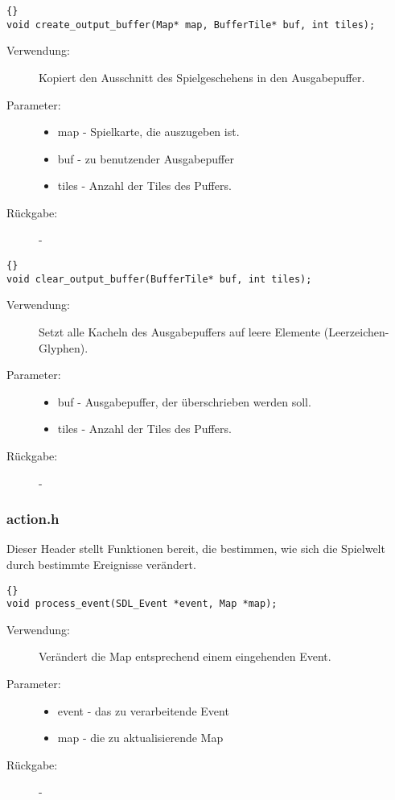 \documentclass[11pt,a4paper,notitlepage]{report}
\begin{document}
		\begin{lstlisting}[caption=create\_output\_buffer]{}
void create_output_buffer(Map* map, BufferTile* buf, int tiles);
		\end{lstlisting}
		
	\begin{description}
		\item[Verwendung:] Kopiert den Ausschnitt des Spielgeschehens in den Ausgabepuffer.
		\item[Parameter:] \hfill
		\begin{itemize}
			\item map - Spielkarte, die auszugeben ist.
			\item buf - zu benutzender Ausgabepuffer
			\item tiles - Anzahl der Tiles des Puffers.
		\end{itemize}
		\item[Rückgabe:] -
	\end{description}
	
		\begin{lstlisting}[caption=flush\_output\_buffer]{}
void clear_output_buffer(BufferTile* buf, int tiles);
		\end{lstlisting}
		
	\begin{description}
		\item[Verwendung:] Setzt alle Kacheln des Ausgabepuffers auf leere Elemente (Leerzeichen-Glyphen).
		\item[Parameter:] \hfill
		\begin{itemize}
			\item buf - Ausgabepuffer, der überschrieben werden soll.
			\item tiles - Anzahl der Tiles des Puffers.
		\end{itemize}
		\item[Rückgabe:] -
	\end{description}

	\newpage
	\subsubsection*{action.h}
	Dieser Header stellt Funktionen bereit, die bestimmen, wie sich die Spielwelt durch bestimmte Ereignisse verändert.

		\begin{lstlisting}[caption=process\_event]{}
void process_event(SDL_Event *event, Map *map);
		\end{lstlisting}
	\begin{description}
		\item[Verwendung:] Verändert die Map entsprechend einem eingehenden Event.
		\item[Parameter:] \hfill
		\begin{itemize}
			\item event - das zu verarbeitende Event
			\item map - die zu aktualisierende Map
		\end{itemize}
		\item[Rückgabe:] -
	\end{description}
	
\end{document}
